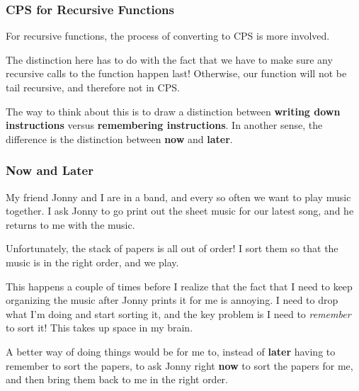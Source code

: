 \documentclass[aspectratio=169, handout]{beamer}
\begin{document}
\begin{frame}[fragile]
  \frametitle{CPS for Recursive Functions}

  For recursive functions, the process of converting to CPS is more involved.

  \pause
  \vspace{\fill}

  The distinction here has to do with the fact that we have to make sure any
  recursive calls to the function happen last! Otherwise, our function will
  not be tail recursive, and therefore not in CPS.

  \pause
  \vspace{\fill}

  The way to think about this is to draw a distinction between
  \textbf{writing down instructions} versus \textbf{remembering instructions}.
  In another sense, the difference is the distinction between \textbf{now}
  and \textbf{later}.
\end{frame}

\begin{frame}[fragile]
  \frametitle{Now and Later}

  \pause
  My friend Jonny and I are in a band, and every so often we want to play music
  together. I ask Jonny to go print out the sheet music for our latest song,
  and he returns to me with the music.

  \pause
  \vspace{\fill}

  Unfortunately, the stack of papers is all out of order! I sort them so that the
  music is in the right order, and we play.

  \pause
  \vspace{\fill}

  This happens a couple of times before I realize that the fact that I need to keep
  organizing the music after Jonny prints it for me is annoying. I need to drop
  what I'm doing and start sorting it, and the key problem is I need to \textit{remember}
  to sort it! This takes up space in my brain.

  \pause
  \vspace{\fill}

  A better way of doing things would be for me to, instead of \textbf{later}
  having to remember to sort the papers, to ask Jonny right \textbf{now} to
  sort the papers for me, and then bring them back to me in the right order.
\end{frame}
\end{document}
